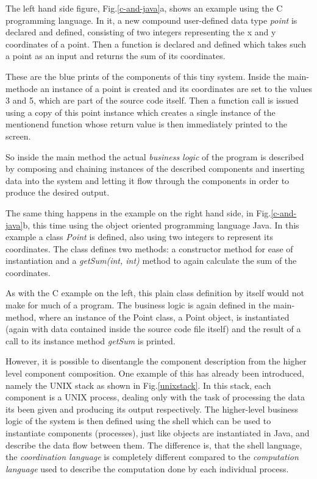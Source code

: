 The left hand side figure, Fig.\ref{c-and-java}a, shows an example
using the C programming language. In it, a new compound user-defined
data type \textit{point} is declared and defined, consisting of two
integers representing the x and y coordinates of a point.
Then a function is declared and defined which takes such a point
as an input and returns the sum of its coordinates.

These are the blue prints of the components of this tiny system.
Inside the main-methode an instance of a point is created and
its coordinates are set to the values 3 and 5, which are part of
the source code itself. Then a function call is issued using a copy of
this point instance which creates a single instance of the mentionend
function whose return value is then immediately printed to the screen.

So inside the main method the actual \textit{business logic} of
the program is described by composing and chaining instances of the
described components and inserting data into the system and letting
it flow through the components in order to produce the desired output.
\newline

The same thing happens in the example on the right hand side, in
Fig.\ref{c-and-java}b, this time using the object oriented
programming language Java. In this example a class \textit{Point} is
defined, also using two integers to represent its coordinates.
The class defines two methods: a constructor method for ease of
instantiation and a \textit{getSum(int, int)} method to again
calculate the sum of the coordinates.

As with the C example on the left, this plain class definition
by itself would not make for much of a program. The business logic
is again defined in the main-method, where an instance of the Point
class, a Point object, is instantiated (again with data contained
inside the source code file itself) and the result of a call to
its instance method \textit{getSum} is printed.
\newline

However, it is possible to disentangle the component description
from the higher level component composition. One example of this
has already been introduced, namely the UNIX stack as shown in
Fig.\ref{unixstack}. In this stack, each component is a UNIX
process, dealing only with the task of processing the data its
been given and producing its output respectively. The higher-level
business logic of the system is then defined using the shell
which can be used to instantiate components (processes),
just like objects are instantiated in Java, and describe the data
flow between them. The difference is, that the shell language, the
\textit{coordination language} is completely
different compared to the \textit{computation language} used to
describe the computation done by each individual process.

